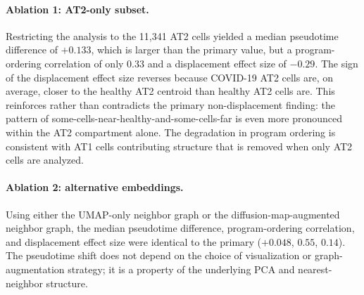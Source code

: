 \documentclass[11pt]{article}
\begin{document}
\paragraph{Ablation 1: AT2-only subset.} Restricting the analysis to the 11{,}341 AT2 cells yielded a median pseudotime difference of $+0.133$, which is larger than the primary value, but a program-ordering correlation of only 0.33 and a displacement effect size of $-0.29$. The sign of the displacement effect size reverses because COVID-19 AT2 cells are, on average, closer to the healthy AT2 centroid than healthy AT2 cells are. This reinforces rather than contradicts the primary non-displacement finding: the pattern of some-cells-near-healthy-and-some-cells-far is even more pronounced within the AT2 compartment alone. The degradation in program ordering is consistent with AT1 cells contributing structure that is removed when only AT2 cells are analyzed.

\paragraph{Ablation 2: alternative embeddings.} Using either the UMAP-only neighbor graph or the diffusion-map-augmented neighbor graph, the median pseudotime difference, program-ordering correlation, and displacement effect size were identical to the primary ($+0.048$, $0.55$, $0.14$). The pseudotime shift does not depend on the choice of visualization or graph-augmentation strategy; it is a property of the underlying PCA and nearest-neighbor structure.
\end{document}
